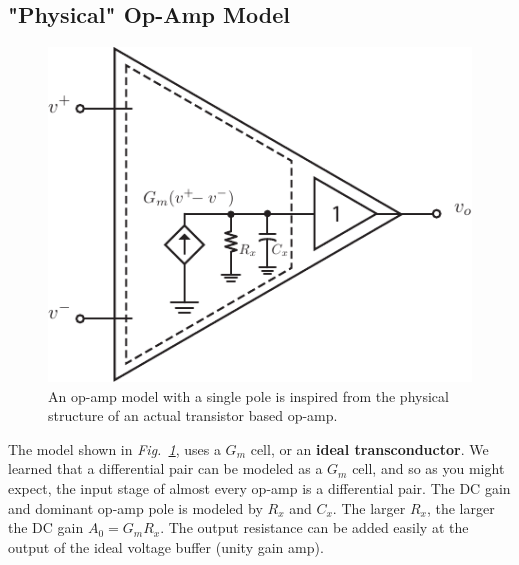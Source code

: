 \subsection{"Physical" Op-Amp Model}
\begin{figure}[tb]
\centering
\includegraphics[scale=1]{opamp_model_pole}
\caption{An op-amp model with a single pole is inspired from the physical structure of an actual transistor based op-amp.}
\label{fig:opamp_model_pole}
\end{figure}
The model shown in \emph{Fig.~\ref{fig:opamp_model_pole}}, uses a $G_m$ cell, or an \textbf{ideal transconductor}.  We learned that a differential pair can be modeled as a $G_m$ cell, and so as you might expect, the input stage of almost every op-amp is a differential pair.  The DC gain and dominant op-amp pole is modeled by $R_x$ and $C_x$.  The larger $R_x$, the larger the DC gain $A_0 = G_m R_x$.  The output resistance can be added easily at the output of the ideal voltage buffer (unity gain amp).
\newpage
